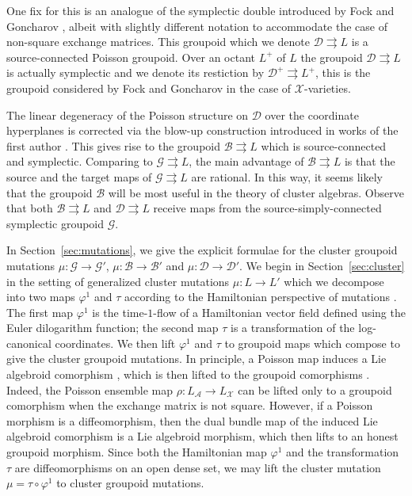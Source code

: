 \documentclass{amsart}
\numberwithin{equation}{section}
\newcommand{\cA}{\mathcal{A}}
\newcommand{\cB}{\mathcal{B}}
\newcommand{\cD}{\mathcal{D}}
\newcommand{\cG}{\mathcal{G}}
\newcommand{\cX}{\mathcal{X}}
\newcommand{\rra}{\rightrightarrows}
\begin{document}
One fix for this is an analogue of the symplectic double introduced by Fock and Goncharov \cite{FG09c}, albeit with slightly different notation to accommodate the case of non-square exchange matrices.
This groupoid which we denote $\cD \rra L$ is a source-connected Poisson groupoid.
Over an octant $L^+$ of $L$ the groupoid $\cD \rra L$ is actually symplectic and we denote its restiction by $\cD^+ \rra L^+$, this is the groupoid considered by Fock and Goncharov in the case of $\cX$-varieties.

The linear degeneracy of the Poisson structure on $\cD$ over the coordinate hyperplanes is corrected via the blow-up construction introduced in works of the first author \cite{MR3312911,MR3214314}.
This gives rise to the groupoid $\cB \rra L$ which is source-connected and symplectic.
Comparing to $\cG \rra L$, the main advantage of $\cB \rra L$ is that the source and the target maps of $\cG \rra L$ are rational.
In this way, it seems likely that the groupoid $\cB$ will be most useful in the theory of cluster algebras.
Observe that both $\cB \rra L$ and $\cD \rra L$ receive maps from the source-simply-connected symplectic groupoid $\cG$.

In Section~\ref{sec:mutations}, we give the explicit formulae for the cluster groupoid mutations $\mu: \cG \to \cG'$, $\mu: \cB \to \cB'$ and $\mu: \cD \to \cD'$.
We begin in Section~\ref{sec:cluster} in the setting of generalized cluster mutations $\mu: L \to L'$ which we decompose into two maps $\varphi^1$ and $\tau$ according to the Hamiltonian perspective of mutations \cite{FG09a, MR3691969}.
The first map $\varphi^1$ is the time-$1$-flow of a Hamiltonian vector field defined using the Euler dilogarithm function; the second map $\tau$ is a transformation of the log-canonical coordinates.
We then lift $\varphi^1$ and $\tau$ to groupoid maps which compose to give the cluster groupoid mutations.
In principle, a Poisson map induces a Lie algebroid comorphism \cite{Higgins1990}, which is then lifted to the groupoid comorphisms \cite{MR2063018, MR3089758}.
Indeed, the Poisson ensemble map $\rho: L_\cA \to L_\cX$ can be lifted only to a groupoid comorphism when the exchange matrix is not square.
However, if a Poisson morphism is a diffeomorphism, then the dual bundle map of the induced Lie algebroid comorphism is a Lie algebroid morphism, which then lifts to an honest groupoid morphism.
Since both the Hamiltonian map $\varphi^1$ and the transformation $\tau$ are diffeomorphisms on an open dense set, we may lift the cluster mutation $\mu = \tau \circ \varphi^1$ to cluster groupoid mutations.
\bigskip
\end{document}
